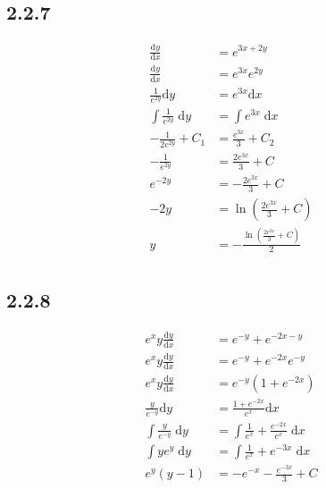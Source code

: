 \documentclass{article}
\begin{document}
\newpage
\subsection{2.2.7}
\begin{align*}
    \frac{\mathrm{d}y}{\mathrm{d}x} &= e^{3x+2y} \\
    \frac{\mathrm{d}y}{\mathrm{d}x} &= e^{3x}e^{2y}\\
    \frac{1}{e^{2y}}\mathrm{d}y &= e^{3x}\mathrm{d}x\\
    \int \frac{1}{e^{2y}} \; \mathrm{d}y &= \int e^{3x} \; \mathrm{d}x \\
     -\frac{1}{2e^{2y}}+C_1 &= \frac{e^{3x}}{3}+C_2 \\
    -\frac{1}{e^{2y}} &= \frac{2e^{3x}}{3}+C \\
    e^{-2y} &= - \frac{2e^{3x}}{3}+C \\
    -2y &= \ln (\frac{2e^{3x}}{3}+C) \\
    y &= -\frac{\ln (\frac{2e^{3x}}{3}+C)}{2}\\
\end{align*}

\subsection{2.2.8}
\begin{align*}
    e^{x}y\frac{\mathrm{d}y}{\mathrm{d}x} &= e^{-y}+e^{-2x-y} \\
    e^{x}y\frac{\mathrm{d}y}{\mathrm{d}x} &= e^{-y}+e^{-2x}e^{-y}\\
    e^{x}y\frac{\mathrm{d}y}{\mathrm{d}x} &= e^{-y}\left(1+e^{-2x}\right)\\
    \frac{y}{e^{-y}}\mathrm{d}y &= \frac{1+e^{-2x}}{e^{x}}\mathrm{d}x \\
    \int \frac{y}{e^{-y}} \; \mathrm{d}y &= \int \frac{1}{e^{x}}+\frac{e^{-2x}}{e^{x}} \; \mathrm{d}x  \\
    \int ye^{y} \;\mathrm{d}y &= \int \frac{1}{e^{x}}+e^{-3x}\; \mathrm{d}x  \\
    e^{y}(y-1) &= -e^{-x}-\frac{e^{-3x}}{3}+C
\end{align*}

\newpage
\end{document}
